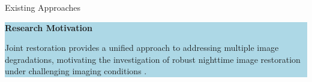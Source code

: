 ﻿\documentclass[
    11pt,%
    aspectratio=169,%
]{beamer}
\begin{document}
\begin{frame}{Existing Approaches}

\begin{beamercolorbox}[
    rounded=true,
    sep=0.08cm,
    wd=\textwidth
]{}

\colorbox{LightBlue}{
    \parbox{\dimexpr\textwidth-2\fboxsep\relax}{
        {\color{Navy}\bfseries
        Research Motivation}

        \vspace{0.05cm}

        \fontsize{9}{11}\selectfont

        Joint restoration provides a unified approach to addressing multiple image degradations, motivating the investigation of robust nighttime image restoration under challenging imaging conditions \cite{zhou2022lednet,feijoo2025darkir}.
    }
}

\end{beamercolorbox}
\end{frame}
\end{document}
